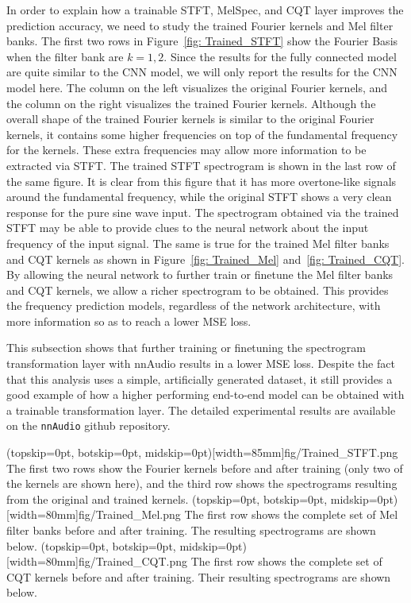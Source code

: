 \documentclass{ieeeaccess}
\newcommand{\nbh}[1]{\texttt{#1}}
\begin{document}
In order to explain how a trainable STFT, MelSpec, and CQT layer improves the prediction accuracy, we need to study the trained Fourier kernels and Mel filter banks. The first two rows in Figure~\ref{fig: Trained_STFT} show the Fourier Basis when the filter bank are $k=1,2$. Since the results for the fully connected model are quite similar to the CNN model, we will only report the results for the CNN model here. The column on the left visualizes the original Fourier kernels, and the column on the right visualizes the trained Fourier kernels. Although the overall shape of the trained Fourier kernels is similar to the original Fourier kernels, it contains some higher frequencies on top of the fundamental frequency for the kernels. These extra frequencies may allow more information to be extracted via STFT. The trained STFT spectrogram is shown in the last row of the same figure. It is clear from this figure that it has more overtone-like signals around the fundamental frequency, while the original STFT shows a very clean response for the pure sine wave input. The spectrogram obtained via the trained STFT may be able to provide clues to the neural network about the input frequency of the input signal. The same is true for the trained Mel filter banks and CQT kernels as shown in Figure~\ref{fig: Trained_Mel} and~\ref{fig: Trained_CQT}. By allowing the neural network to further train or finetune the Mel filter banks and CQT kernels, we allow a richer spectrogram to be obtained. This provides the frequency prediction models, regardless of the network architecture, with more information so as to reach a lower MSE loss.

This subsection shows that further training or finetuning the spectrogram transformation layer with nnAudio results in a lower MSE loss. Despite the fact that this analysis uses a simple, artificially generated dataset, it still provides a good example of how a higher performing end-to-end model can be obtained with a trainable transformation layer. The detailed experimental results are available on the \nbh{nnAudio} github repository\footnotemark[\ref{nnAudio}].

\Figure(topskip=0pt, botskip=0pt, midskip=0pt)[width=85mm]{fig/Trained_STFT.png}
{The first two rows show the Fourier kernels before and after training (only two of the kernels are shown here), and the third row shows the spectrograms resulting from the original and trained kernels.  \label{fig: Trained_STFT}}
\Figure(topskip=0pt, botskip=0pt, midskip=0pt)[width=80mm]{fig/Trained_Mel.png}
{The first row shows the complete set of Mel filter banks before and after training. The resulting spectrograms are shown below.\label{fig: Trained_Mel}}
\Figure(topskip=0pt, botskip=0pt, midskip=0pt)[width=80mm]{fig/Trained_CQT.png}
{The first row shows the complete set of CQT kernels before and after training. Their resulting spectrograms are shown below. \label{fig: Trained_CQT}}
\end{document}
